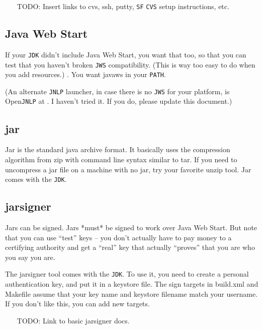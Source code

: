 \documentclass{article}
\begin{document}
\begin{itemize}
\item[TODO:]  Insert links to cvs, ssh, putty, \texttt{SF} \texttt{CVS} setup instructions, etc.
\end{itemize}

\subsection{Java Web Start}

If your \texttt{JDK} didn't include Java Web Start, you want that too, so 
that you can test that you haven't broken \texttt{JWS} compatibility.  (This
is way too easy to do when you add resources.)
. You want javaws in your
\texttt{PATH}.

(An alternate \texttt{JNLP} launcher, in case there is no \texttt{JWS} for your platform,
is Open\texttt{JNLP} at . I haven't
tried it. If you do, please update this document.)

\subsection{jar}

Jar is the standard java archive format.  It basically uses the compression 
algorithm from zip with command line syntax similar to tar.  If you need to 
uncompress a jar file on a machine with no jar, try your favorite unzip tool.  
Jar comes with the \texttt{JDK}.

\subsection{jarsigner}

Jars can be signed.  Jars *must* be signed to work over Java Web Start.
But note that you can use ``test'' keys -- you don't actually have to
pay money to a certifying authority and get a ``real'' key that actually
``proves'' that you are who you say you are.

The jarsigner tool comes with the \texttt{JDK}.  To use it, you need to create
a personal authentication key, and put it in a keystore file.  The sign
targets in build.xml and Makefile assume that your key name and keystore
filename match your username.  If you don't like this, you can add new
targets.

\begin{itemize}
\item[TODO:]  Link to basic jarsigner docs.
\end{itemize}
\end{document}
